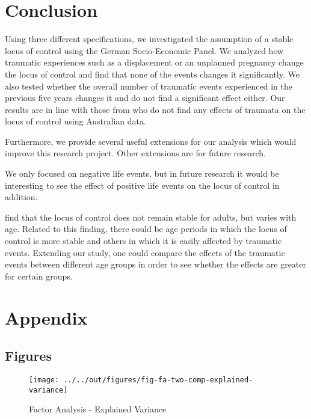 \documentclass[12pt, a4paper, fleqn, parskip]{scrartcl}
\begin{document}


\section{Conclusion} %
\label{sec:conclusion}

Using three different specifications, we investigated the assumption of a stable locus
of control using the German Socio-Economic Panel. We analyzed how traumatic experiences
such as a displacement or an unplanned pregnancy change the locus of control and find
that none of the events changes it significantly. We also tested whether the overall
number of traumatic events experienced in the previous five years changes it and do not
find a significant effect either. Our results are in line with those from
\citet{cobb2013} who do not find any effects of traumata on the locus of control using
Australian data.

Furthermore, we provide several useful extensions for our analysis which would improve
this research project. Other extensions are for future research.

We only focused on negative life events, but in future research it would be interesting
to see the effect of positive life events on the locus of control in addition.

\citet{specht2013} find that the locus of control does not remain stable for adults, but
varies with age. Related to this finding, there could be age periods in which the locus
of control is more stable and others in which it is easily affected by traumatic events.
Extending our study, one could compare the effects of the traumatic events between
different age groups in order to see whether the effects are greater for certain groups.


\printbibliography

\appendix
\setcounter{secnumdepth}{0}
\section{Appendix}

\subsection{Figures} %
\label{sub:figures}

\begin{figure}[H]
    \centering
    \texttt{[image: ../../out/figures/fig-fa-two-comp-explained-variance]}
    \caption{Factor Analysis - Explained Variance}
    \label{fig:fa_ev}
\end{figure}
\end{document}
